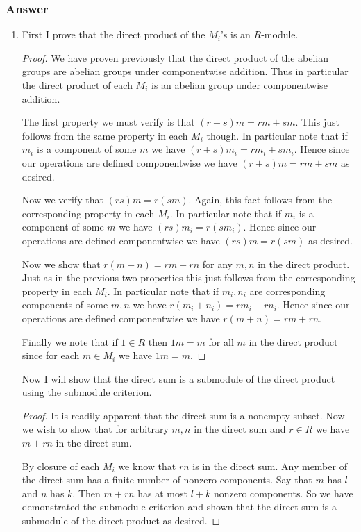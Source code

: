 \documentclass[12pt]{article}
\begin{document}
\subsubsection{Answer}
\begin{enumerate}
\item First I prove that the direct product of the $M_i$'s is an $R$-module.

\begin{proof}
We have proven previously that the direct product of the abelian groups are abelian groups under componentwise addition. Thus in particular the direct product of each $M_i$ is an abelian group under componentwise addition.

The first property we must verify is that $(r+s)m = rm +sm$. This just follows from the same property in each $M_i$ though. In particular note that if $m_i$ is a component of some $m$ we have $(r+s)m_i = rm_i +sm_i$. Hence since our operations are defined componentwise we have $(r+s)m = rm +sm$ as desired.

Now we verify that $(rs) m = r (sm)$. Again, this fact follows from the corresponding property in each $M_i$. In particular note that if $m_i$ is a component of some $m$ we have $(rs) m_i = r (sm_i)$. Hence since our operations are defined componentwise we have $(rs) m = r (sm)$ as desired.

Now we show that $r(m+n) = rm +rn$ for any $m, n$ in the direct product. Just as in the previous two properties this just follows from the corresponding property in each $M_i$. In particular note that if $m_i, n_i$  are corresponding  components of some $m,n$ we have $r(m_i+n_i) = rm_i +rn_i$. Hence since our operations are defined componentwise we have $r(m+n) = rm +rn$.

Finally we note that if $1 \in R$ then $1m = m$ for all $m$ in the direct product since for each $m \in M_i$ we have $1m=m$.
\end{proof}

Now I will show that the direct sum is a submodule of the direct product using the submodule criterion.

\begin{proof}
It is readily apparent that the direct sum is a nonempty subset. Now we wish to show that for arbitrary $m, n$ in the direct sum and $r \in R$ we have $m+r n $ in the direct sum. 

By closure of each $M_i$ we know that $r n $ is in the direct sum. Any member of the direct sum has a finite number of nonzero components. Say that $m$ has $l$ and $n$ has $k$. Then $m+r n $ has at most $l +k$ nonzero components. So we have demonstrated the submodule criterion and shown that the direct sum is a submodule of the direct product as desired.
\end{proof}


\end{enumerate}
\end{document}
